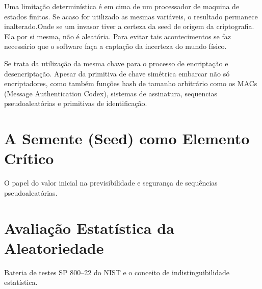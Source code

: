         Uma limitação determinística é em cima de um processador de maquina de estados finitos.
        Se acaso for utilizado as mesmas variáveis, o resultado permanece inalterado.\@ Onde se um invasor 
        tiver a certeza da seed de origem da criptografia. Ela por si mesma, não é aleatória. Para evitar tais acontecimentos
        se faz necessário que o software faça a captação da incerteza do mundo físico.


        Se trata da utilização da mesma chave para o processo de encriptação e desencriptação. Apesar da primitiva de chave simétrica embarcar
        não só encriptadores, como também funções hash de tamanho arbitrário como os MACs (Message Authentication Codex), sistemas de assinatura, sequencias pseudoaleatórias
        e primitivas de identificação.

    \section{A Semente (Seed) como Elemento Crítico}

    O papel do valor inicial na previsibilidade e segurança de sequências pseudoaleatórias.

    \section{Avaliação Estatística da Aleatoriedade}

        Bateria de testes SP 800--22 do NIST e o conceito de indistinguibilidade estatística.

